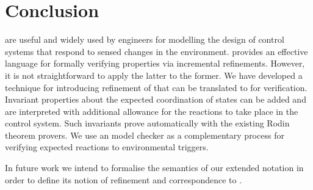 \section{Conclusion}
\label{sec:conc}

 \SCs are useful and widely used by engineers for modelling the design of control systems that respond to sensed changes in the environment.  
 \EventB provides an effective language for formally verifying properties via incremental refinements.
 However, it is not straightforward to apply the latter to the former.
 We have developed a technique for introducing refinement of \SCs that can be translated to \EventB for verification.
 Invariant properties about the expected coordination of states can be added and are interpreted with additional allowance for the reactions to take place in the control system. 
 Such invariants prove automatically with the existing Rodin theorem provers.  
 We use an \LTL model checker as a complementary process for verifying expected reactions to environmental triggers.

In future work we intend to formalise the semantics of our extended \SCXML notation in order to define its notion of refinement and correspondence to \EventB.
